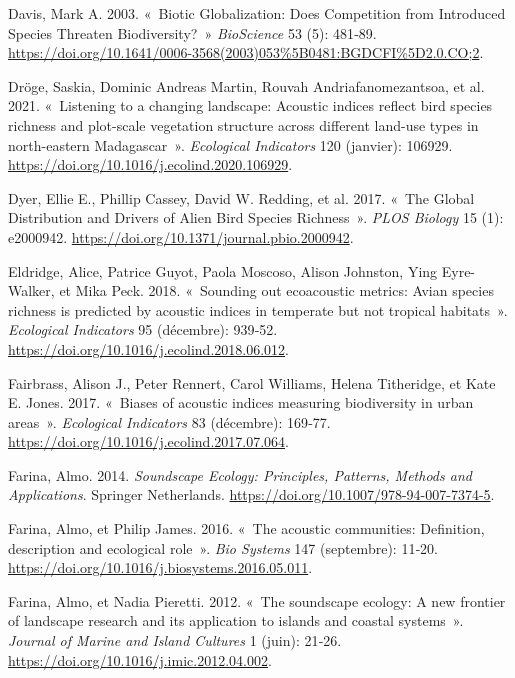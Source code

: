 \documentclass[
  french,
  11pt,
]{stylisharticle}
\newlength{\cslhangindent}
\newenvironment{CSLReferences}[2] %
 {\begin{list}{}{%
  \setlength{\itemindent}{0pt}
  \setlength{\leftmargin}{0pt}
  \setlength{\parsep}{0pt}
  \ifodd #1
   \setlength{\leftmargin}{\cslhangindent}
   \setlength{\itemindent}{-1\cslhangindent}
  \fi
  \setlength{\itemsep}{#2\baselineskip}}}
 {\end{list}}
\begin{document}
\begin{CSLReferences}{1}{1}
Davis, Mark A. 2003. {«~Biotic Globalization: Does Competition from
Introduced Species Threaten Biodiversity?~»} \emph{BioScience} 53 (5):
481‑89.
\url{https://doi.org/10.1641/0006-3568(2003)053\%5B0481:BGDCFI\%5D2.0.CO;2}.

Dröge, Saskia, Dominic Andreas Martin, Rouvah Andriafanomezantsoa, et
al. 2021. {«~Listening to a changing landscape: Acoustic indices reflect
bird species richness and plot-scale vegetation structure across
different land-use types in north-eastern Madagascar~»}.
\emph{Ecological Indicators} 120 (janvier): 106929.
\url{https://doi.org/10.1016/j.ecolind.2020.106929}.

Dyer, Ellie E., Phillip Cassey, David W. Redding, et al. 2017. {«~The
Global Distribution and Drivers of Alien Bird Species Richness~»}.
\emph{PLOS Biology} 15 (1): e2000942.
\url{https://doi.org/10.1371/journal.pbio.2000942}.

Eldridge, Alice, Patrice Guyot, Paola Moscoso, Alison Johnston, Ying
Eyre-Walker, et Mika Peck. 2018. {«~Sounding out ecoacoustic metrics:
Avian species richness is predicted by acoustic indices in temperate but
not tropical habitats~»}. \emph{Ecological Indicators} 95 (décembre):
939‑52. \url{https://doi.org/10.1016/j.ecolind.2018.06.012}.

Fairbrass, Alison J., Peter Rennert, Carol Williams, Helena Titheridge,
et Kate E. Jones. 2017. {«~Biases of acoustic indices measuring
biodiversity in urban areas~»}. \emph{Ecological Indicators} 83
(décembre): 169‑77. \url{https://doi.org/10.1016/j.ecolind.2017.07.064}.

Farina, Almo. 2014. \emph{Soundscape Ecology: Principles, Patterns,
Methods and Applications}. Springer Netherlands.
\url{https://doi.org/10.1007/978-94-007-7374-5}.

Farina, Almo, et Philip James. 2016. {«~The acoustic communities:
Definition, description and ecological role~»}. \emph{Bio Systems} 147
(septembre): 11‑20.
\url{https://doi.org/10.1016/j.biosystems.2016.05.011}.

Farina, Almo, et Nadia Pieretti. 2012. {«~The soundscape ecology: A new
frontier of landscape research and its application to islands and
coastal systems~»}. \emph{Journal of Marine and Island Cultures} 1
(juin): 21‑26. \url{https://doi.org/10.1016/j.imic.2012.04.002}.


\end{CSLReferences}
\end{document}
